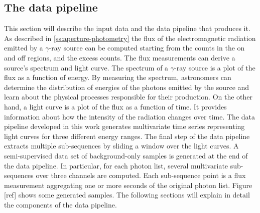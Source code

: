 \subsection{The data pipeline}
\label{ss:data-pipeline}
This section will describe the input data and the data pipeline that produces it. As described in \autoref{ss:aperture-photometry} the flux of the electromagnetic radiation emitted by a $\gamma$-ray source can be computed starting from the counts in the on and off regions, and the excess counts. The flux measurements can derive a source's spectrum and light curve. The spectrum of a $\gamma$-ray source is a plot of the flux as a function of energy. By measuring the spectrum, astronomers can determine the distribution of energies of the photons emitted by the source and learn about the physical processes responsible for their production. On the other hand, a light curve is a plot of the flux as a function of time. It provides information about how the intensity of the radiation changes over time. The data pipeline developed in this work generates multivariate time series representing light curves for three different energy ranges. The final step of the data pipeline extracts multiple sub-sequences by sliding a window over the light curves. 
A semi-supervised data set of background-only samples is generated at the end of the data pipeline. In particular, for each photon list, several multivariate sub-sequences over three channels are computed. Each sub-sequence point is a flux measurement aggregating one or more seconds of the original photon list. Figure [ref] shows some generated samples. The following sections will explain in detail the components of the data pipeline.

